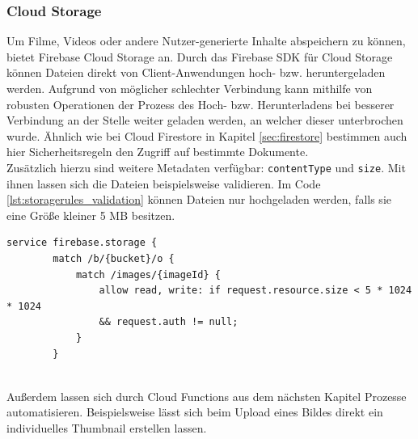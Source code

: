 \subsubsection{Cloud Storage}
\label{sec:firebase_storage}
Um Filme, Videos oder andere Nutzer-generierte Inhalte abspeichern zu können, bietet Firebase Cloud Storage an. 
Durch das Firebase SDK für Cloud Storage können Dateien direkt von Client-Anwendungen hoch- bzw. heruntergeladen werden.
Aufgrund von möglicher schlechter Verbindung kann mithilfe von robusten Operationen der Prozess des Hoch- bzw. Herunterladens bei besserer Verbindung an der Stelle weiter geladen werden, an welcher dieser unterbrochen wurde.
Ähnlich wie bei Cloud Firestore in Kapitel \ref{sec:firestore} bestimmen auch hier Sicherheitsregeln den Zugriff auf bestimmte Dokumente.\\
Zusätzlich hierzu sind weitere Metadaten verfügbar: \texttt{contentType} und \texttt{size}. 
Mit ihnen lassen sich die Dateien beispielsweise validieren.
Im Code \ref{lst:storagerules_validation} können Dateien nur hochgeladen werden, falls sie eine Größe kleiner 5 MB besitzen.
\medskip
\begin{lstlisting}[caption=Validierung nach Dateigröße, label=lst:storagerules_validation]
	service firebase.storage {
		match /b/{bucket}/o {
			match /images/{imageId} {
				allow read, write: if request.resource.size < 5 * 1024 * 1024
				&& request.auth != null;
			}
		}
		
\end{lstlisting}
\medskip
Außerdem lassen sich durch Cloud Functions aus dem nächsten Kapitel Prozesse automatisieren. Beispielsweise lässt sich beim Upload eines Bildes direkt ein individuelles Thumbnail erstellen lassen.\cite{firebase2021}
